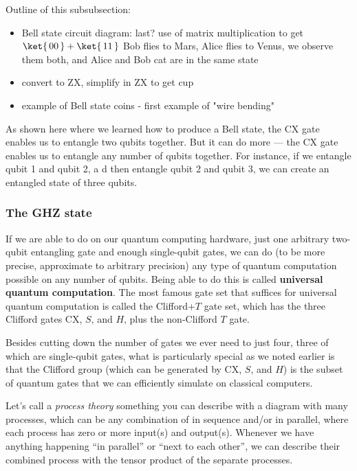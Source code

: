 \documentclass{article}
\theoremstyle{definition}
\newcommand{\kz}[1]{\ket{\,#1\,}}
\begin{document}
Outline of this subsubsection:
\begin{itemize}
	\item Bell state circuit diagram: last? use of matrix multiplication to get $\kz{00} + \kz{11}$ Bob flies to Mars, Alice flies to Venus, we observe them both, and Alice and Bob cat are in the same state
	\item convert to ZX, simplify in ZX to get cup
	\item example of Bell state coins - first example of "wire bending"	
\end{itemize}

As shown here where we learned how to produce a Bell state, the CX gate enables us to entangle two qubits together.  But it can do more --- the CX gate enables us to entangle any number of qubits together.  For instance, if we entangle qubit 1 and qubit 2, a d then entangle qubit 2 and qubit 3, we can create an entangled state of three qubits.

\subsubsection{The GHZ state}


If we are able to do on our quantum computing hardware, just one arbitrary two-qubit entangling gate and enough single-qubit gates, we can do (to be more precise, approximate to arbitrary precision) any type of quantum computation possible on any number of qubits.  Being able to do this is called \textbf{universal quantum computation}.  The most famous gate set that suffices for universal quantum computation is called the Clifford+$T$ gate set, which has the three Clifford gates CX, $S$, and $H$, plus the non-Clifford $T$ gate.

Besides cutting down the number of gates we ever need to just four, three of which are single-qubit gates, what is particularly special as we noted earlier is that the Clifford group (which can be generated by CX, $S$, and $H$) is the subset of quantum gates that we can efficiently simulate on classical computers.






Let's call a \emph{process theory} something you can describe with a diagram with many processes, which can be any combination of in sequence and/or in parallel, where each process has zero or more input(s) and output(s).  Whenever we have anything happening ``in parallel'' or ``next to each other'', we can describe their combined process with the tensor product of the separate processes.
\end{document}
